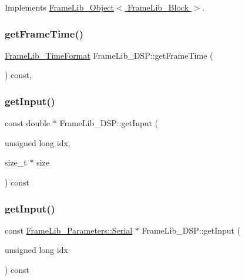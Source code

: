 Implements \hyperlink{class_frame_lib___object_ab34877668c8b6a2ca5efa6bc10368820}{Frame\+Lib\+\_\+\+Object$<$ Frame\+Lib\+\_\+\+Block $>$}.

\mbox{\label{class_frame_lib___d_s_p_a2eedff2474f665b5bf7d2f2fa7a1cdc4}} 
\subsubsection{\texorpdfstring{get\+Frame\+Time()}{getFrameTime()}}
{\footnotesize\ttfamily \hyperlink{struct_frame_lib___time_format}{Frame\+Lib\+\_\+\+Time\+Format} Frame\+Lib\+\_\+\+D\+S\+P\+::get\+Frame\+Time (\begin{DoxyParamCaption}{ }\end{DoxyParamCaption}) const\hspace{0.3cm}{\ttfamily [inline]}, {\ttfamily [protected]}}

\mbox{\label{class_frame_lib___d_s_p_aea9dee37e1093a12f7764b12ab430a19}} 
\subsubsection{\texorpdfstring{get\+Input()}{getInput()}\hspace{0.1cm}{\footnotesize\ttfamily [1/2]}}
{\footnotesize\ttfamily const double $\ast$ Frame\+Lib\+\_\+\+D\+S\+P\+::get\+Input (\begin{DoxyParamCaption}\item[{unsigned long}]{idx,  }\item[{size\+\_\+t $\ast$}]{size }\end{DoxyParamCaption}) const\hspace{0.3cm}{\ttfamily [protected]}}

\mbox{\label{class_frame_lib___d_s_p_ae2d4474b0545fcc2cbb5ffcfcf75fc94}} 
\subsubsection{\texorpdfstring{get\+Input()}{getInput()}\hspace{0.1cm}{\footnotesize\ttfamily [2/2]}}
{\footnotesize\ttfamily const \hyperlink{class_frame_lib___parameters_1_1_serial}{Frame\+Lib\+\_\+\+Parameters\+::\+Serial} $\ast$ Frame\+Lib\+\_\+\+D\+S\+P\+::get\+Input (\begin{DoxyParamCaption}\item[{unsigned long}]{idx }\end{DoxyParamCaption}) const\hspace{0.3cm}{\ttfamily [protected]}}

